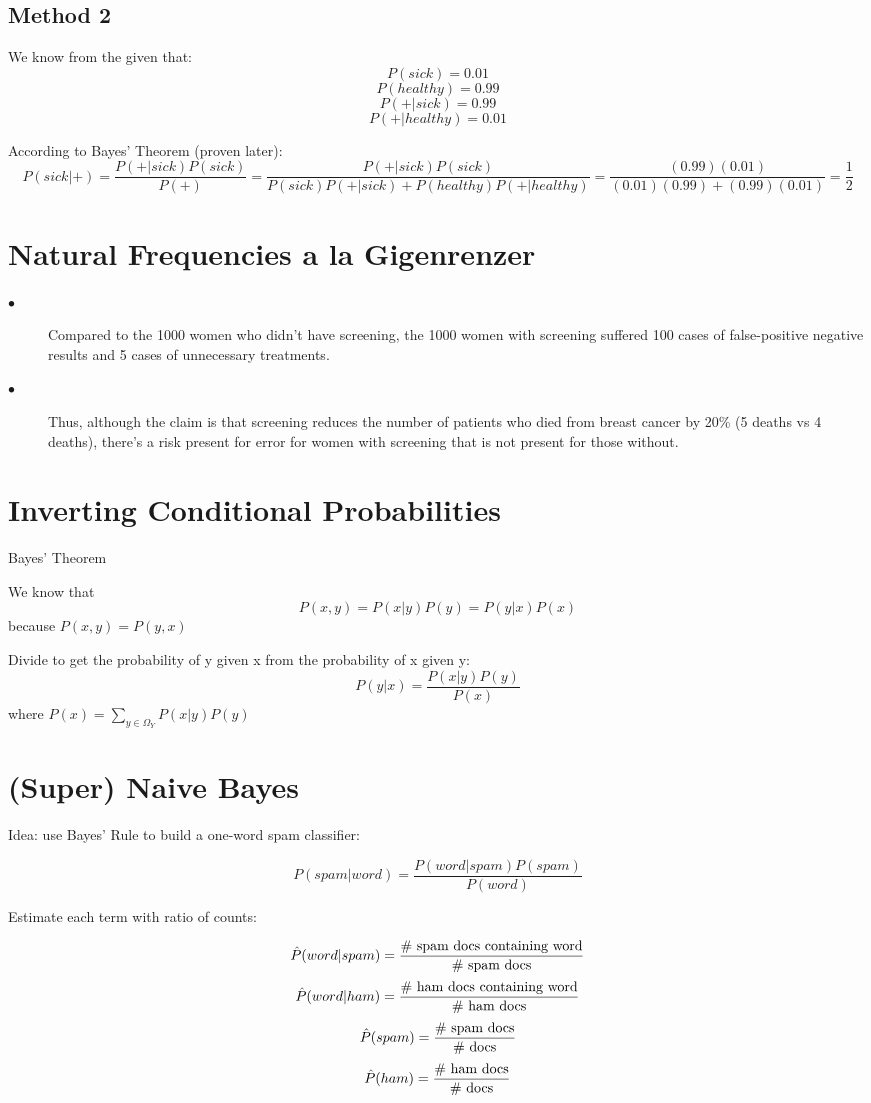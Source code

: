 \subsection{Method 2}
We know from the given that: 
$$P(sick) = 0.01$$
$$P(healthy) = 0.99$$
$$P(+ | sick) = 0.99$$
$$P(+ | healthy) = 0.01$$

According to Bayes' Theorem (proven later):
$$
P(sick | + ) = \frac{P(+ | sick)P(sick)}{P(+)} 
= \frac{P(+|sick)P(sick)}{P(sick)P(+|sick) + P(healthy)P(+|healthy)}  = 
\frac{(0.99)(0.01)}{(0.01)(0.99)+(0.99)(0.01)} =
\frac{1}{2}
$$

\section{Natural Frequencies a la Gigenrenzer}

\begin{description}
\item[$\bullet$]Compared to the 1000 women who didn't have screening, the 1000 women with screening suffered 100 cases of false-positive negative results and 5 cases of unnecessary treatments. 
\item[$\bullet$] Thus, although the claim is that screening reduces the number of patients who died from breast cancer by 20\% (5 deaths vs 4 deaths), there's a risk present for error for women with screening that is not present for those without.
\end{description}


\section{Inverting Conditional Probabilities}
Bayes' Theorem

We know that
$$P(x,y) = P(x|y)P(y) = P(y|x)P(x)$$ because $P(x,y) = P(y,x)$

Divide to get the probability of y given x from the probability of x given y:
$$P(y|x) = \frac{P(x|y)P(y)}{P(x)}$$ where $P(x) = \sum_{y \in \Omega_Y}P(x|y)P(y)$

\section{(Super) Naive Bayes}
Idea: use Bayes' Rule to build a one-word spam classifier:

$$P(spam|word) = \frac{P(word|spam)P(spam)}{P(word)}$$

Estimate each term with ratio of counts: 

$$\hat{P}(word|spam) = \frac{
\textup{\# 
spam docs containing word}}{\textup{\# spam docs}}$$
$$\hat{P}(word|ham) = \frac{\textup{\# ham docs containing word}}{\textup{\# ham docs}}$$
$$\hat{P}(spam) = \frac{\textup{\# spam docs}}{\textup{\# docs}} $$
$$\hat{P}(ham) = \frac{\textup{\# ham docs}}{\textup{\# docs}}$$

